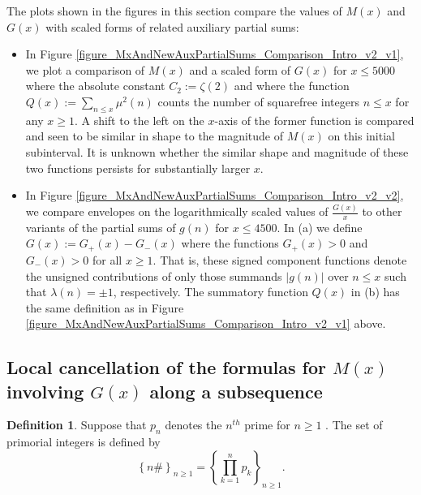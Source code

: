 \documentclass[11pt,reqno,a4letter]{article}
\newcommand{\hlocalref}[1]{\hyperref[#1]{\ref{#1}}}
\numberwithin{equation}{section}
\numberwithin{figure}{section}
\numberwithin{table}{section}
\newcommand{\seqnum}[1]{\href{http://oeis.org/#1}{\color{ProcessBlue}{\underline{#1}}}}
\theoremstyle{plain}
\numberwithin{theorem}{section}
\theoremstyle{definition}
\newtheorem{definition}[theorem]{Definition}
\begin{document}
The plots shown in the figures in this section compare 
the values of $M(x)$ and $G(x)$ with scaled forms of related auxiliary partial sums: 
\begin{itemize}[noitemsep,topsep=0pt,leftmargin=0.23in]

\item In Figure \hlocalref{figure_MxAndNewAuxPartialSums_Comparison_Intro_v2_v1}, 
      we plot a comparison of $M(x)$ and a scaled form of $G(x)$ for $x \leq 5000$ where 
      the absolute constant $C_2 := \zeta(2)$ and where the function 
      $Q(x) := \sum_{n \leq x} \mu^2(n)$ counts the number of squarefree integers $n \leq x$ for any 
      $x \geq 1$. A shift to the left on the $x$-axis of the former function 
      is compared and seen to be similar in shape to the magnitude of $M(x)$ on this initial subinterval. 
      It is unknown whether the similar shape and magnitude of these two functions persists for 
      substantially larger $x$. 

\item In Figure \hlocalref{figure_MxAndNewAuxPartialSums_Comparison_Intro_v2_v2}, we compare 
      envelopes on the logarithmically scaled values of $\frac{G(x)}{x}$ to other variants of 
      the partial sums of $g(n)$ for $x \leq 4500$. 
      In (a) we define $G(x) := G_{+}(x) - G_{-}(x)$ where the functions 
      $G_{+}(x) > 0$ and $G_{-}(x) > 0$ for all $x \geq 1$. 
      That is, these signed component functions denote the unsigned contributions of only those summands 
      $|g(n)|$ over $n \leq x$ such that $\lambda(n) = \pm 1$, respectively. 
      The summatory function $Q(x)$ in (b) has the same definition as in 
      Figure \hlocalref{figure_MxAndNewAuxPartialSums_Comparison_Intro_v2_v1} above. 

\end{itemize}

\subsection{Local cancellation of 
	    the formulas for $M(x)$ involving $G(x)$ along a subsequence} 
\label{subSection_LocalCancellationOfGInvx} 

\begin{definition}
Suppose that $p_n$ denotes the $n^{th}$ prime for $n \geq 1$ 
\cite[\seqnum{A000040}]{OEIS}. 
The set of primorial integers is defined by  
\cite[\seqnum{A002110}]{OEIS} 
\[
\left\{n\#\right\}_{n \geq 1} = \left\{\prod_{k=1}^{n} p_k\right\}_{n \geq 1}. 
\]
\end{definition}
\end{document}
